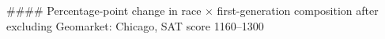 #### Percentage-point change in race × first-generation composition after excluding Geomarket: Chicago, SAT score 1160–1300
